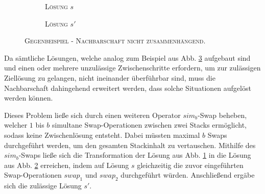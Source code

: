 \begin{figure}[H]
  \begin{subfigure}[b]{0.5\textwidth}
  \centering
    \caption{\textsc{Lösung $s$}}
    \label{fig:counter_a}
  \end{subfigure}
  \hfill
  \begin{subfigure}[b]{0.5\textwidth}
  \centering
    \caption{\textsc{Lösung $s'$}}
    \label{fig:counter_b}
  \end{subfigure}
  \caption{\textsc{Gegenbeispiel - Nachbarschaft nicht zusammenhängend.}}
  \label{fig:counter_example_stacks}
\end{figure}

Da sämtliche Lösungen, welche analog zum Beispiel aus Abb. \ref{fig:counter_example_stacks} aufgebaut sind und einen oder mehrere unzulässige Zwischenschritte erfordern, um zur zulässigen Ziellösung zu gelangen, nicht ineinander überführbar sind, muss die Nachbarschaft dahingehend erweitert werden, dass solche Situationen aufgelöst werden können.

\vfill
\pagebreak

Dieses Problem ließe sich durch einen weiteren Operator $sim_b$-Swap beheben, welcher $1$ bis $b$ simultane Swap-Operationen
zwischen zwei Stacks ermöglicht, sodass keine Zwischenlösung entsteht.
Dabei müssten maximal $b$ Swaps durchgeführt werden, um den gesamten Stackinhalt zu vertauschen.
Mithilfe des $sim_b$-Swaps ließe sich die Transformation der Lösung aus Abb. \ref{fig:counter_a} in die Lösung aus Abb. \ref{fig:counter_b} erreichen, indem auf Lösung $s$ gleichzeitig die zuvor eingeführten Swap-Operationen $swap_1$ und $swap_2$ durchgeführt würden.
Anschließend ergäbe sich die zulässige Lösung $s'$.

